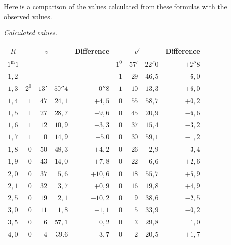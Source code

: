 Here is a comparison of the values calculated from these formulas with the observed values.
\begin{center}
\textit{Calculated values.}\par
\nopagebreak[4]
\setlength{\tabcolsep}{4pt}
\begin{tabular}{c||rrr|r||rrr|r}
$R$&\multicolumn{3}{c|}{$v$}&Difference&\multicolumn{3}{c|}{$v'$}&Difference\\\hline
$1^{\mathrm m}1$&&&&&$1^0$&$57'$&$22''0$&$+2''8$\\
$1{,}2$&&&&&$1$&$29$&$46{,}5$&$-6{,}0$\\
$1{,}3$&$2^0$&$13'$&$50''4$&$+0''8$&$1$&$10$&$13{,}3$&$+6{,}0$\\
$1{,}4$&$1$&$47$&$24{,}1$&$+4{,}5$&$0$&$55$&$58{,}7$&$+0{,}2$\\
$1{,}5$&$1$&$27$&$28{,}7$&$-9{,}6$&$0$&$45$&$20{,}9$&$-6{,}6$\\
$1{,}6$&$1$&$12$&$10{,}9$&$-3{,}3$&$0$&$37$&$15{,}4$&$-3{,}2$\\
$1{,}7$&$1$&$0$&$14{,}9$&$-5.0$&$0$&$30$&$59{,}1$&$-1{,}2$\\
$1{,}8$&$0$&$50$&$48{,}3$&$+4{,}2$&$0$&$26$&$2{,}9$&$-3{,}4$\\
$1{,}9$&$0$&$43$&$14{,}0$&$+7{,}8$&$0$&$22$&$6{,}6$&$+2{,}6$\\
$2{,}0$&$0$&$37$&$5{,}6$&$+10{,}6$&$0$&$18$&$55{,}7$&$+5{,}9$\\
$2{,}1$&$0$&$32$&$3{,}7$&$+0{,}9$&$0$&$16$&$19{,}8$&$+4{,}9$\\
$2{,}5$&$0$&$19$&$2{,}1$&$-10{,}2$&$0$&$9$&$38{,}6$&$-2{,}5$\\
$3{,}0$&$0$&$11$&$1{,}8$&$-1{,}1$&$0$&$5$&$33{,}9$&$-0{,}2$\\
$3{,}5$&$0$&$6$&$57{,}1$&$-0{,}2$&$0$&$3$&$29{,}8$&$-1{,}0$\\
$4{,}0$&$0$&$4$&$39.6$&$-3{,}7$&$0$&$2$&$20{,}5$&$+1{,}7$
\end{tabular}
\end{center}

